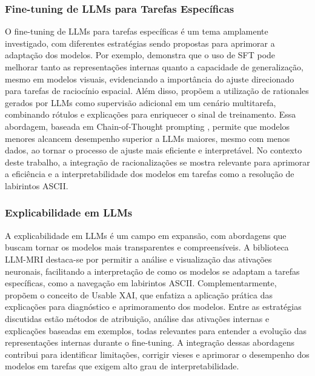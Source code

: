 \subsubsection{Fine-tuning de LLMs para Tarefas Específicas}

O fine-tuning de LLMs para tarefas específicas é um tema amplamente investigado, com diferentes estratégias sendo propostas para aprimorar a adaptação dos modelos. Por exemplo, \cite{wang2024pictureworththousandwords} demonstra que o uso de SFT pode melhorar tanto as representações internas quanto a capacidade de generalização, mesmo em modelos visuais, evidenciando a importância do ajuste direcionado para tarefas de raciocínio espacial. Além disso, \cite{hsieh2023distillingstepbystep} propõem a utilização de rationales gerados por LLMs como supervisão adicional em um cenário multitarefa, combinando rótulos e explicações para enriquecer o sinal de treinamento. Essa abordagem, baseada em Chain-of-Thought prompting \cite{wei2023chainofthought}, permite que modelos menores alcancem desempenho superior a LLMs maiores, mesmo com menos dados, ao tornar o processo de ajuste mais eficiente e interpretável. No contexto deste trabalho, a integração de racionalizações se mostra relevante para aprimorar a eficiência e a interpretabilidade dos modelos em tarefas como a resolução de labirintos ASCII.

\subsubsection{Explicabilidade em LLMs}

A explicabilidade em LLMs é um campo em expansão, com abordagens que buscam tornar os modelos mais transparentes e compreensíveis. A biblioteca LLM-MRI \cite{costa2024llmmri} destaca-se por permitir a análise e visualização das ativações neuronais, facilitando a interpretação de como os modelos se adaptam a tarefas específicas, como a navegação em labirintos ASCII. Complementarmente, \cite{wu2025usablexai10strategies} propõem o conceito de Usable XAI, que enfatiza a aplicação prática das explicações para diagnóstico e aprimoramento dos modelos. Entre as estratégias discutidas estão métodos de atribuição, análise das ativações internas e explicações baseadas em exemplos, todas relevantes para entender a evolução das representações internas durante o fine-tuning. A integração dessas abordagens contribui para identificar limitações, corrigir vieses e aprimorar o desempenho dos modelos em tarefas que exigem alto grau de interpretabilidade.